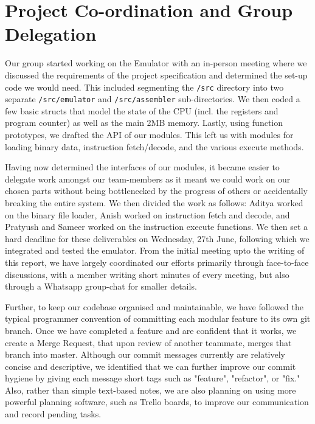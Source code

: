 \documentclass{article}
\begin{document}
\vspace*{-1em}

\vspace{0.3em}

\section{Project Co-ordination and Group Delegation}

Our group started working on the Emulator with an in-person meeting where we discussed the requirements of the project specification and determined the set-up code we would need. This included segmenting the \verb|/src| directory into two separate \verb|/src/emulator| and \verb|/src/assembler| sub-directories. We then coded a few basic structs that model the state of the CPU (incl. the registers and program counter) as well as the main 2MB memory. Lastly, using function prototypes, we drafted the API of our modules. This left us with modules for loading binary data, instruction fetch/decode, and the various execute methods. 

Having now determined the interfaces of our modules, it became easier to delegate work amongst our team-members as it meant we could work on our chosen parts without being bottlenecked by the progress of others or accidentally breaking the entire system. We then divided the work as follows: Aditya worked on the binary file loader, Anish worked on instruction fetch and decode, and Pratyush and Sameer worked on the instruction execute functions. We then set a hard deadline for these deliverables on Wednesday, 27th June, following which we integrated and tested the emulator. From the initial meeting upto the writing of this report, we have largely coordinated our efforts primarily through face-to-face discussions, with a member writing short minutes of every meeting, but also through a Whatsapp group-chat for smaller details.  

Further, to keep our codebase organised and maintainable, we have followed the typical programmer convention of committing each modular feature to its own git branch. Once we have completed a feature and are confident that it works, we create a Merge Request, that upon review of another teammate, merges that branch into master. Although our commit messages currently are relatively concise and descriptive, we identified that we can further improve our commit hygiene by giving each message short tags such as "feature", "refactor", or "fix." Also, rather than simple text-based notes, we are also planning on using more powerful planning software, such as Trello boards, to improve our communication and record pending tasks. 
\end{document}
